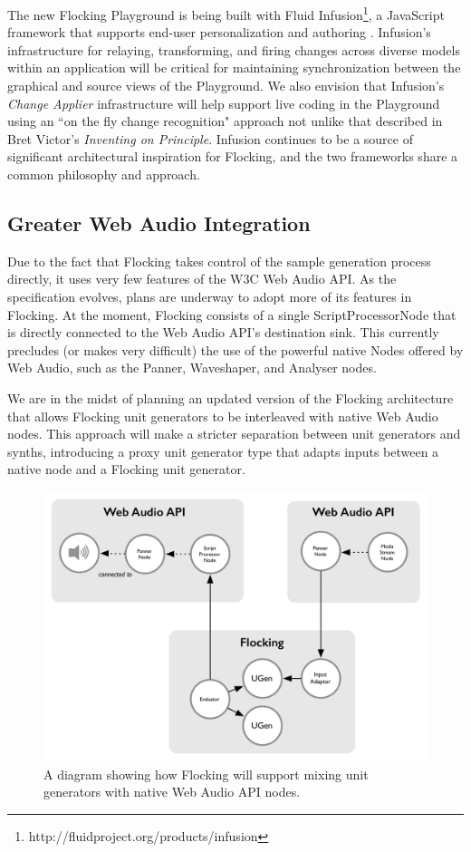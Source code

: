 \documentclass{article}
\begin{document}
The new Flocking Playground is being built with Fluid Infusion\footnote{http://fluidproject.org/products/infusion}, a JavaScript framework that supports end-user personalization and authoring \cite{hcii2014}. Infusion's infrastructure for relaying, transforming, and firing changes across diverse models within an application will be critical for maintaining synchronization between the graphical and source views of the Playground. We also envision that Infusion's {\it Change Applier} infrastructure will help support live coding in the Playground using an ``on the fly change recognition" approach not unlike that described in Bret Victor's {\it Inventing on Principle}\cite{victor2012inventing}. Infusion continues to be a source of significant architectural inspiration for Flocking, and the two frameworks share a common philosophy and approach.

\subsection{Greater Web Audio Integration}

Due to the fact that Flocking takes control of the sample generation process directly, it uses very few features of the W3C Web Audio API. As the specification evolves, plans are underway to adopt more of its features in Flocking. At the moment, Flocking consists of a single ScriptProcessorNode that is directly connected to the Web Audio API's destination sink. This currently precludes (or makes very difficult) the use of the powerful native Nodes offered by Web Audio, such as the Panner, Waveshaper, and Analyser nodes.

We are in the midst of planning an updated version of the Flocking architecture that allows Flocking unit generators to be interleaved with native Web Audio nodes. This approach will make a stricter separation between unit generators and synths, introducing a proxy unit generator type that adapts inputs between a native node and a Flocking unit generator.

\begin{figure}[ht]
\centering
\includegraphics[width=0.9\columnwidth]{images/flocking-web-audio-islands.png}
\caption{ A diagram showing how Flocking will support mixing unit generators with native Web Audio API nodes.\label{fig:webaudioflocking}}
\end{figure}
\end{document}

